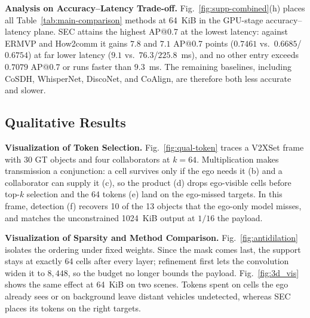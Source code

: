 \noindent\textbf{Analysis on Accuracy--Latency Trade-off.}
Fig.~\ref{fig:supp-combined}(h) places all Table~\ref{tab:main-comparison} methods at 64~KiB in the GPU-stage accuracy--latency plane. SEC attains the highest AP@0.7 at the lowest latency: against ERMVP and How2comm it gains $7.8$ and $7.1$ AP@0.7 points ($0.7461$ vs.\ $0.6685$/$0.6754$) at far lower latency ($9.1$ vs.\ $76.3$/$225.8$~ms), and no other entry exceeds $0.7079$ AP@0.7 or runs faster than $9.3$~ms. The remaining baselines, including CoSDH, WhisperNet, DiscoNet, and CoAlign, are therefore both less accurate and slower.

\subsection{Qualitative Results}
\label{sec:qualitative}

\noindent\textbf{Visualization of Token Selection.}
Fig.~\ref{fig:qual-token} traces a V2XSet frame with 30 GT objects and four collaborators at $k{=}64$. Multiplication makes transmission a conjunction: a cell survives only if the ego needs it (b) and a collaborator can supply it (c), so the product (d) drops ego-visible cells before top-$k$ selection and the 64 tokens (e) land on the ego-missed targets. In this frame, detection (f) recovers 10 of the 13 objects that the ego-only model misses, and matches the unconstrained 1024~KiB output at $1/16$ the payload.

\noindent\textbf{Visualization of Sparsity and Method Comparison.}
Fig.~\ref{fig:antidilation} isolates the ordering under fixed weights. Since the mask comes last, the support stays at exactly 64 cells after every layer; refinement first lets the convolution widen it to $8{,}448$, so the budget no longer bounds the payload. Fig.~\ref{fig:3d_vis} shows the same effect at 64~KiB on two scenes. Tokens spent on cells the ego already sees or on background leave distant vehicles undetected, whereas SEC places its tokens on the right targets.
